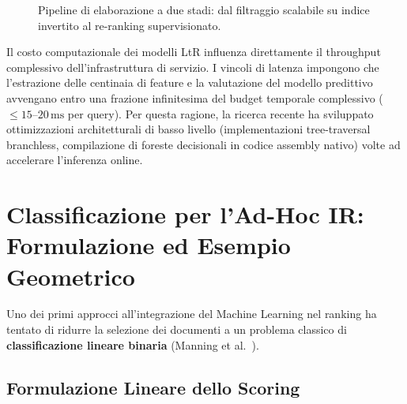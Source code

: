 \begin{figure}[H]
{%
}
\caption{Pipeline di elaborazione a due stadi: dal filtraggio scalabile su indice invertito al re-ranking supervisionato.}
\label{fig:ltr-two-stage-pipeline}
\end{figure}

Il costo computazionale dei modelli LtR influenza direttamente il throughput complessivo dell'infrastruttura di servizio. I vincoli di latenza impongono che l'estrazione delle centinaia di feature e la valutazione del modello predittivo avvengano entro una frazione infinitesima del budget temporale complessivo ($\le 15\text{--}20\,\text{ms}$ per query). Per questa ragione, la ricerca recente ha sviluppato ottimizzazioni architetturali di basso livello (implementazioni tree-traversal branchless, compilazione di foreste decisionali in codice assembly nativo) volte ad accelerare l'inferenza online.

\FloatBarrier
\section{Classificazione per l'Ad-Hoc IR: Formulazione ed Esempio Geometrico}
\label{sec:classificazione-adhoc-ir-geometria}

Uno dei primi approcci all'integrazione del Machine Learning nel ranking ha tentato di ridurre la selezione dei documenti a un problema classico di \textbf{classificazione lineare binaria} (Manning et al.~\cite{manning2008}).

\FloatBarrier
\subsection{Formulazione Lineare dello Scoring}
\label{subsec:formulazione-lineare-scoring}


